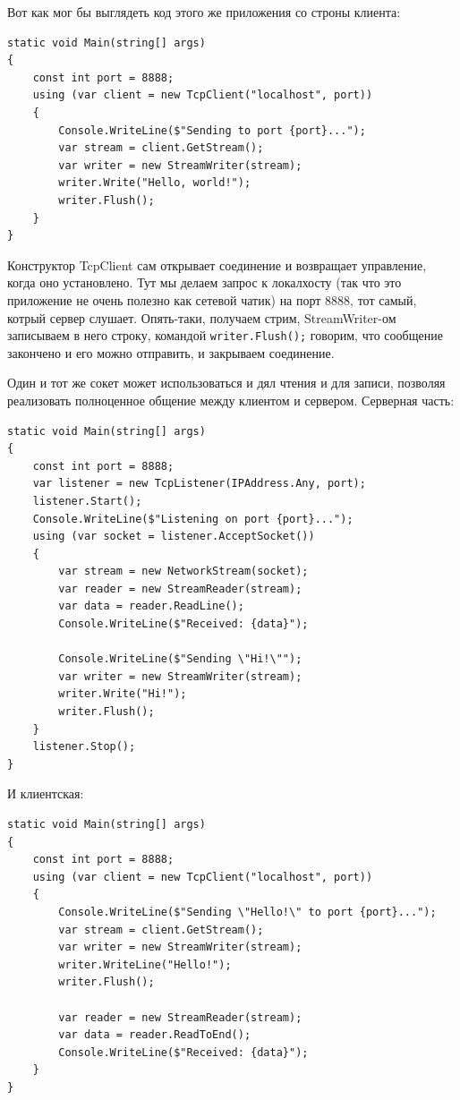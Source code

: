 \documentclass[a5paper]{article}
\begin{document}
Вот как мог бы выглядеть код этого же приложения со строны клиента:

\begin{verbatim}
static void Main(string[] args)
{
    const int port = 8888;
    using (var client = new TcpClient("localhost", port))
    {
        Console.WriteLine($"Sending to port {port}...");
        var stream = client.GetStream();
        var writer = new StreamWriter(stream);
        writer.Write("Hello, world!");
        writer.Flush();
    }
}
\end{verbatim}

Конструктор TcpClient сам открывает соединение и возвращает управление, когда оно установлено. Тут мы делаем запрос к локалхосту (так что это приложение не очень полезно как сетевой чатик) на порт 8888, тот самый, котрый сервер слушает. Опять-таки, получаем стрим, StreamWriter-ом записываем в него строку, командой \texttt{writer.Flush();} говорим, что сообщение закончено и его можно отправить, и закрываем соединение.

Один и тот же сокет может использоваться и дял чтения и для записи, позволяя реализовать полноценное общение между клиентом и сервером. Серверная часть:

\begin{verbatim}
static void Main(string[] args)
{
    const int port = 8888;
    var listener = new TcpListener(IPAddress.Any, port);
    listener.Start();
    Console.WriteLine($"Listening on port {port}...");
    using (var socket = listener.AcceptSocket())
    {
        var stream = new NetworkStream(socket);
        var reader = new StreamReader(stream);
        var data = reader.ReadLine();
        Console.WriteLine($"Received: {data}");

        Console.WriteLine($"Sending \"Hi!\"");
        var writer = new StreamWriter(stream);
        writer.Write("Hi!");
        writer.Flush();
    }
    listener.Stop();
}
\end{verbatim}

И клиентская: 

\begin{verbatim}
static void Main(string[] args)
{
    const int port = 8888;
    using (var client = new TcpClient("localhost", port))
    {
        Console.WriteLine($"Sending \"Hello!\" to port {port}...");
        var stream = client.GetStream();
        var writer = new StreamWriter(stream);
        writer.WriteLine("Hello!");
        writer.Flush();

        var reader = new StreamReader(stream);
        var data = reader.ReadToEnd();
        Console.WriteLine($"Received: {data}");
    }
}
\end{verbatim}
\end{document}
